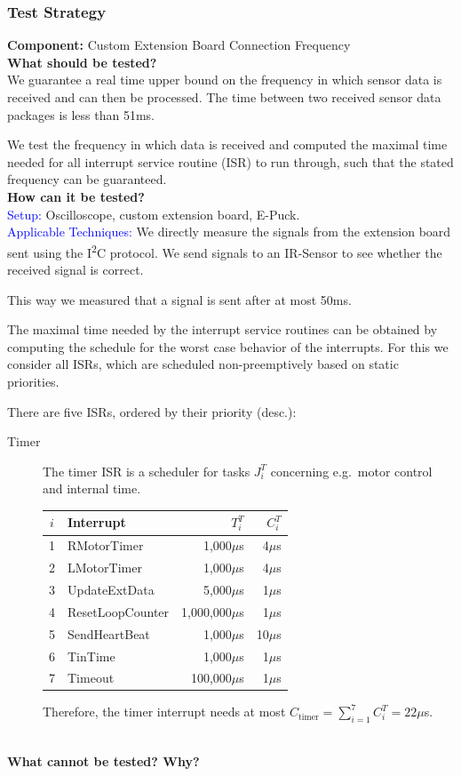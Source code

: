 \documentclass[a4paper,parskip,headheight=38pt]{scrartcl} %
\newcommand{\teststrat}[5]{
    \subsubsection{Test Strategy}
	\textbf{Component:} #1 \\
	\noindent\textbf{What should be tested?} \\
    \noindent #2 \\
	\noindent\textbf{How can it be tested?} \\
    \noindent\textcolor{blue}{Setup:} #3 \\
    \noindent\textcolor{blue}{Applicable Techniques:} #4 \\
	\noindent\textbf{What cannot be tested? Why?} \\
    \noindent #5
}
\newcommand{\mics}{$\mu$s}
\begin{document}
\teststrat{Custom Extension Board Connection Frequency}{
    We guarantee a real time upper bound on the frequency in which sensor data
    is received and can then be processed. The time between two received
    sensor data packages is less than 51ms.

    We test the frequency in which data is received and computed the maximal
    time needed for all interrupt service routine (ISR) to run through, such
    that the
    stated frequency can be guaranteed.
}{
    Oscilloscope, custom extension board, E-Puck.
}{
    We directly measure the signals from the extension board sent using the
    I\textsuperscript{2}C protocol. We send signals to an IR-Sensor to see
    whether the received signal is correct.

    This way we measured that a signal is sent after at most 50ms. 

    The maximal time needed by the interrupt service routines can be obtained by
    computing the schedule for the worst case behavior of the interrupts. For
    this we consider all ISRs, which are scheduled non-preemptively based on
    static priorities.

    There are five ISRs, ordered by their priority (desc.):
    \begin{description}
        \item[Timer] The timer ISR is a scheduler for tasks $J^T_i$ concerning
            e.g.\ motor control and internal time. \\
            \begin{center}
            \begin{tabular}{c | l | r | r}
                $i$ & Interrupt & $T^T_i$ & $C^T_i$ \\
                \hline
                1 & RMotorTimer         & 1,000\mics     & 4\mics \\
                2 & LMotorTimer         & 1,000\mics     & 4\mics \\
                3 & UpdateExtData       & 5,000\mics     & 1\mics \\
                4 & ResetLoopCounter    & 1,000,000\mics & 1\mics \\
                5 & SendHeartBeat       & 1,000\mics     & 10\mics \\
                6 & TinTime             & 1,000\mics     & 1\mics \\
                7 & Timeout             & 100,000\mics   & 1\mics \\
            \end{tabular}
            \end{center}
            Therefore, the timer interrupt needs at most $C_{\text{timer}}
            = \sum_{i = 1}^{7}C^T_i = 22$\mics.


\end{description}}
\end{document}
